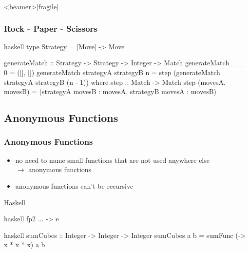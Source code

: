 \documentclass[dvipsnames]{beamer}
\theoremstyle{plain}
\begin{document}
\begin{frame}<beamer>[fragile]
  \frametitle{Rock - Paper - Scissors}

  \begin{exampleblock}{}
    \begin{pygments}{haskell}
type Strategy = [Move] -> Move

generateMatch :: Strategy -> Strategy
                     -> Integer -> Match
generateMatch _         _         0 = ([], [])
generateMatch strategyA strategyB n =
    step (generateMatch strategyA strategyB (n - 1))
      where
        step :: Match -> Match
        step (movesA, movesB) =
            (strategyA movesB : movesA,
             strategyB movesA : movesB)
    \end{pygments}
  \end{exampleblock}
\end{frame}

\subsection{Anonymous Functions}

\begin{frame}[fragile]
  \frametitle{Anonymous Functions}

  \begin{itemize}
    \item no need to name small functions that are not used anywhere else\\
      $\rightarrow$ \alert{anonymous functions}
    \item anonymous functions can't be recursive
  \end{itemize}

  \pause
  \begin{block}{Haskell}
    \begin{pygments}{haskell}
       fp2 ... -> e
    \end{pygments}
  \end{block}

  \medskip
  \begin{example}{}
    \begin{pygments}{haskell}
sumCubes :: Integer -> Integer -> Integer
sumCubes a b = sumFunc (\x -> x * x * x) a b
    \end{pygments}
  \end{example}
\end{frame}
\end{document}
